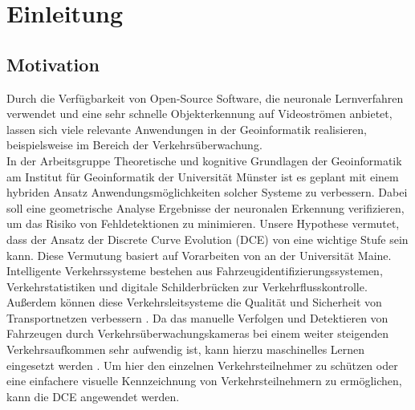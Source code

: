 \chapter{Einleitung}
\label{ch:intro}

\section{Motivation}{ 
	
Durch die Verfügbarkeit von Open-Source Software, die neuronale Lernverfahren verwendet und eine sehr schnelle Objekterkennung auf Videoströmen anbietet, lassen sich viele relevante Anwendungen in der Geoinformatik realisieren, beispielsweise im Bereich der Verkehrsüberwachung. \\
In der Arbeitsgruppe \glqq Theoretische und kognitive Grundlagen der Geoinformatik\grqq{} am Institut für Geoinformatik der Universität Münster ist es geplant mit einem hybriden Ansatz Anwendungsmöglichkeiten solcher Systeme zu verbessern. Dabei soll eine geometrische Analyse Ergebnisse der neuronalen Erkennung verifizieren, um das Risiko von Fehldetektionen zu minimieren. Unsere Hypothese vermutet, dass der Ansatz der Discrete Curve Evolution (DCE) von \citet{Latecki1999a}  eine wichtige Stufe sein kann. Diese Vermutung basiert auf Vorarbeiten von \citet*{Dorr2015} an der Universität Maine.\\

Intelligente Verkehrssysteme bestehen aus Fahrzeugidentifizierungssystemen, Verkehrstatistiken und digitale Schilderbrücken zur Verkehrflusskontrolle. Außerdem können diese Verkehrsleitsysteme die Qualität und Sicherheit von Transportnetzen verbessern \citep{Pavani2022}. Da das manuelle Verfolgen und Detektieren von Fahrzeugen durch Verkehrsüberwachungskameras bei einem weiter steigenden Verkehrsaufkommen sehr aufwendig ist, kann hierzu maschinelles Lernen eingesetzt werden \citep{Pavani2022}. Um hier den einzelnen Verkehrsteilnehmer zu schützen oder eine einfachere visuelle Kennzeichnung von Verkehrsteilnehmern zu ermöglichen, kann die DCE angewendet werden. 
}



